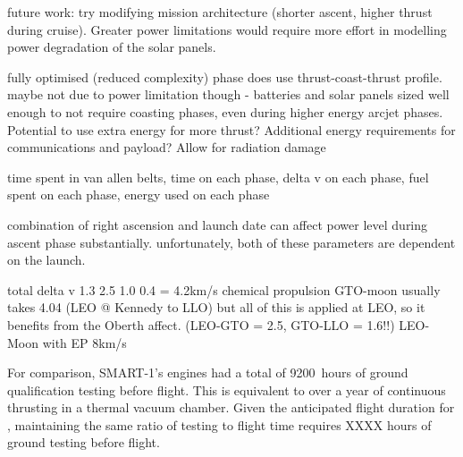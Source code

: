 future work: try modifying mission architecture (shorter ascent, higher thrust during cruise). Greater power limitations would require more effort in modelling power degradation of the solar panels.


fully optimised (reduced complexity) phase does use thrust-coast-thrust profile. maybe not due to power limitation though - batteries and solar panels sized well enough to not require coasting phases, even during higher energy arcjet phases. Potential to use extra energy for more thrust? Additional energy requirements for communications and payload? Allow for radiation damage


time spent in van allen belts, time on each phase, delta v on each phase, fuel spent on each phase, energy used on each phase

combination of right ascension and launch date can affect power level during ascent phase substantially. unfortunately, both of these parameters are dependent on the launch.


total delta v 
1.3 2.5 1.0 0.4 = 4.2km/s
chemical propulsion GTO-moon usually takes 4.04 (LEO @ Kennedy to LLO) but all of this is applied at LEO, so it benefits from the Oberth affect. (LEO-GTO = 2.5, GTO-LLO = 1.6!!)
LEO-Moon with EP 8km/s


For comparison, SMART-1's engines had a total of 9200~hours of ground qualification testing before flight. This is equivalent to over a year of continuous thrusting in a thermal vacuum chamber. Given the anticipated flight duration for \BW, maintaining the same ratio of testing to flight time requires XXXX hours of ground testing before flight.


